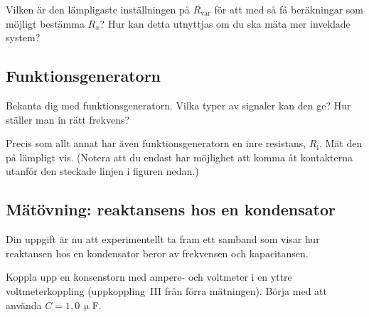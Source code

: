 \documentclass[a4paper,11pt]{article}
\begin{document}
Vilken är den lämpligaste inställningen på $R_\mathrm{var}$ för att
med så få beräkningar som möjligt bestämma $R_x$? Hur kan detta utnyttjas om du
ska mäta mer inveklade system?

\subsection*{Funktionsgeneratorn}

Bekanta dig med funktionsgeneratorn. Vilka typer av signaler kan den 
ge? Hur ställer man in rätt frekvens? 

Precis som allt annat har även funktionsgeneratorn en inre resistans,
$R_\mathrm{i}$. Mät den på lämpligt vis. (Notera att du endast har möjlighet att
komma åt kontakterna utanför den steckade linjen i figuren nedan.)

\begin{figure}[h]
	\centering
        \resizebox{0.4\textwidth}{!}{}
\end{figure}








\subsection*{Mätövning: reaktansens hos en kondensator}

Din uppgift är nu att  experimentellt ta fram ett samband som visar hur 
reaktansen hos en kondensator beror av frekvensen och kapacitansen.

Koppla upp en konsenstorn med ampere- och voltmeter i en yttre voltmeterkoppling
(uppkoppling~III från förra mätningen). Börja med att använda $C=1,0\,\upmu$F.

\end{document}
